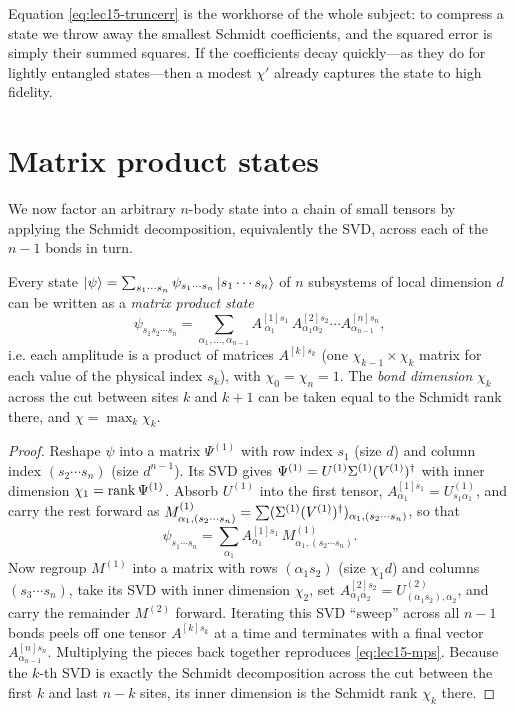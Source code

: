 Equation \eqref{eq:lec15-truncerr} is the workhorse of the whole subject: to
compress a state we throw away the smallest Schmidt coefficients, and the squared
error is simply their summed squares. If the coefficients decay quickly---as they
do for lightly entangled states---then a modest $\chi'$ already captures the state
to high fidelity.

\section{Matrix product states}
\label{sec:lec15-3}

We now factor an arbitrary $n$-body state into a chain of small tensors by
applying the Schmidt decomposition, equivalently the SVD, across each of the
$n-1$ bonds in turn.

\begin{theorem}\label{thm:lec15-mps}
Every state $\ket{\psi}=\sum_{s_1\cdots s_n}\psi_{s_1\cdots s_n}\ket{s_1\cdots s_n}$
of $n$ subsystems of local dimension $d$ can be written as a \emph{matrix product
state}
\begin{equation}\label{eq:lec15-mps}
  \psi_{s_1 s_2\cdots s_n}
   =\sum_{\alpha_1,\dots,\alpha_{n-1}}
     A^{[1]s_1}_{\;\alpha_1}\,A^{[2]s_2}_{\alpha_1\alpha_2}\cdots
     A^{[n]s_n}_{\alpha_{n-1}},
\end{equation}
i.e. each amplitude is a product of matrices $A^{[k]s_k}$ (one $\chi_{k-1}\times\chi_k$
matrix for each value of the physical index $s_k$), with $\chi_0=\chi_n=1$. The
\emph{bond dimension} $\chi_k$ across the cut between sites $k$ and $k+1$ can be
taken equal to the Schmidt rank there, and $\chi=\max_k\chi_k$.
\end{theorem}

\begin{proof}
Reshape $\psi$ into a matrix $\Psi^{(1)}$ with row index $s_1$ (size $d$) and
column index $(s_2\cdots s_n)$ (size $d^{n-1}$). Its SVD gives
$\Psi^{(1)}=U^{(1)}\Sigma^{(1)}(V^{(1)})^{\dagger}$ with inner dimension $\chi_1=\operatorname{rank}\Psi^{(1)}$.
Absorb $U^{(1)}$ into the first tensor, $A^{[1]s_1}_{\alpha_1}=U^{(1)}_{s_1\alpha_1}$,
and carry the rest forward as $M^{(1)}_{\alpha_1,(s_2\cdots s_n)}
=\sum(\Sigma^{(1)}(V^{(1)})^{\dagger})_{\alpha_1,(s_2\cdots s_n)}$, so that
\[
  \psi_{s_1\cdots s_n}=\sum_{\alpha_1}A^{[1]s_1}_{\alpha_1}\,M^{(1)}_{\alpha_1,(s_2\cdots s_n)} .
\]
Now regroup $M^{(1)}$ into a matrix with rows $(\alpha_1 s_2)$ (size $\chi_1 d$)
and columns $(s_3\cdots s_n)$, take its SVD with inner dimension $\chi_2$, set
$A^{[2]s_2}_{\alpha_1\alpha_2}=U^{(2)}_{(\alpha_1 s_2),\alpha_2}$, and carry the
remainder $M^{(2)}$ forward. Iterating this SVD ``sweep'' across all $n-1$ bonds
peels off one tensor $A^{[k]s_k}$ at a time and terminates with a final vector
$A^{[n]s_n}_{\alpha_{n-1}}$. Multiplying the pieces back together reproduces
\eqref{eq:lec15-mps}. Because the $k$-th SVD is exactly the Schmidt decomposition
across the cut between the first $k$ and last $n-k$ sites, its inner dimension is
the Schmidt rank $\chi_k$ there.
\end{proof}

